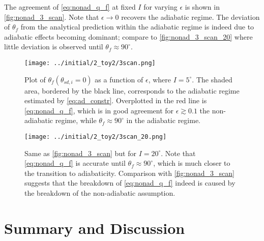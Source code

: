 \documentclass[
        fleqn,
        usenatbib,
        referee,
    ]{mnras}
\newcommand*{\p}[1]{\left(#1\right)}
\begin{document}
The agreement of \autoref{eq:nonad_q_f} at fixed $I$ for varying $\epsilon$ is
shown in \autoref{fig:nonad_3_scan}. Note that $\epsilon \to 0$ recovers the
adiabatic regime. The deviation of $\theta_f$ from the analytical prediction
within the adiabatic regime is indeed due to adiabatic effects becoming
dominant; compare to \autoref{fig:nonad_3_scan_20} where little deviation is
observed until $\theta_f \approx 90^\circ$.
\begin{figure}
    \centering
    \texttt{[image: ../initial/2\_toy2/3scan.png]}
    \caption{Plot of $\theta_{ f}\p{\theta_{sd, i} = 0}$ as a function of
    $\epsilon$, where $I = 5^\circ$. The shaded area, bordered by the black
    line, corresponds to the adiabatic regime estimated by
    \autoref{eq:ad_constr}. Overplotted in the red line is
    \autoref{eq:nonad_q_f}, which is in good agreement for $\epsilon \gtrsim
    0.1$ the non-adiabatic regime, while $\theta_{f} \approx 90^\circ$ in the
    adiabatic regime.}\label{fig:nonad_3_scan}
\end{figure}
\begin{figure}
    \centering
    \texttt{[image: ../initial/2\_toy2/3scan\_20.png]}
    \caption{Same as \autoref{fig:nonad_3_scan} but for $I=20^\circ$. Note that
    \autoref{eq:nonad_q_f} is accurate until $\theta_f \approx 90^\circ$, which
    is much closer to the transition to adiabaticity. Comparison with
    \autoref{fig:nonad_3_scan} suggests that the breakdown of
    \autoref{eq:nonad_q_f} indeed is caused by the breakdown of the
    non-adiabatic assumption.}\label{fig:nonad_3_scan_20}
\end{figure}

\section{Summary and Discussion}\label{s:disc}
\end{document}

